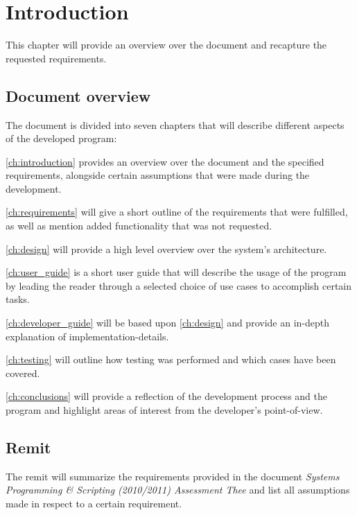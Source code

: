 \chapter{Introduction}\label{ch:introduction}

This chapter will provide an overview over the document and recapture the requested requirements.

\section{Document overview}
\label{sec:document_overview}

The document is divided into seven chapters that will describe different aspects of the developed program:

\autoref{ch:introduction} provides an overview over the document and the specified requirements, alongside certain assumptions that were made during the development.

\autoref{ch:requirements} will give a short outline of the requirements that were fulfilled, as well as mention added functionality that was not requested.

\autoref{ch:design} will provide a high level overview over the system's architecture.

\autoref{ch:user_guide} is a short user guide that will describe the usage of the program by leading the reader through a selected choice of use cases to accomplish certain tasks.

\autoref{ch:developer_guide} will be based upon \autoref{ch:design} and provide an in-depth explanation of implementation-details.

\autoref{ch:testing} will outline how testing was performed and which cases have been covered.

\autoref{ch:conclusions} will provide a reflection of the development process and the program and highlight areas of interest from the developer's point-of-view.

\section{Remit}
\label{sec:remit}

The remit will summarize the requirements provided in the document \textit{Systems Programming \& Scripting (2010/2011) Assessment Thee} and list all assumptions made in respect to a certain requirement.

